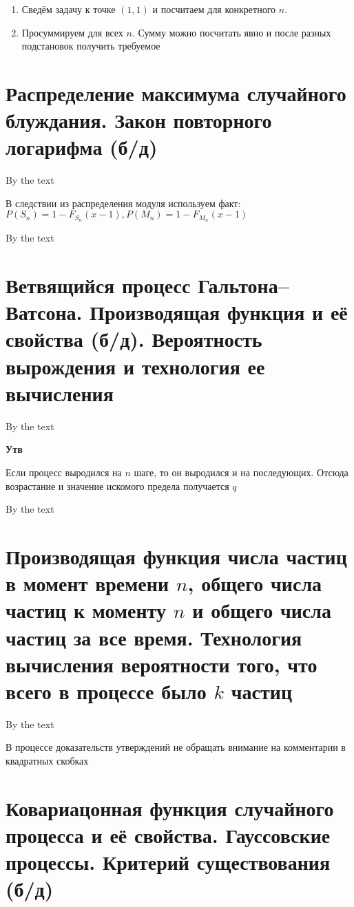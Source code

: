 \documentclass[a4paper, 14pt]{article}
\begin{document}
    \begin{enumerate}
        \item Сведём задачу к точке $(1,1)$ и посчитаем для конкретного $n$.
        \item Просуммируем для всех $n$.
        Сумму можно посчитать явно и после разных подстановок получить требуемое
    \end{enumerate}
    
    \section{Распределение максимума случайного блуждания. Закон повторного логарифма (б/д)}
    
    By the text
    
    В следствии из распределения модуля используем факт: $P(S_n) = 1 - F_{S_n}(x-1), P(M_n) = 1 - F_{M_n}(x-1)$
    
    By the text
    
    \section{Ветвящийся процесс Гальтона–Ватсона.
    Производящая функция и её свойства (б/д).
    Вероятность вырождения и технология ее вычисления}
    
    By the text
    
    \textbf{Утв}
    
    Если процесс выродился на $n$ шаге, то он выродился и на последующих.
    Отсюда возрастание и значение искомого предела получается $q$
    
    By the text
    
    \section{Производящая функция числа частиц в момент времени $n$, общего числа частиц к моменту $n$ и общего числа
    частиц за все время.
    Технология вычисления вероятности того, что всего в процессе было $k$ частиц}
    
    By the text
    
    В процессе доказательств утверждений не обращать внимание на комментарии в квадратных скобках
    
    \section{Ковариацонная функция случайного процесса и её свойства.
    Гауссовские процессы.
    Критерий существования (б/д)}
    
\end{document}
